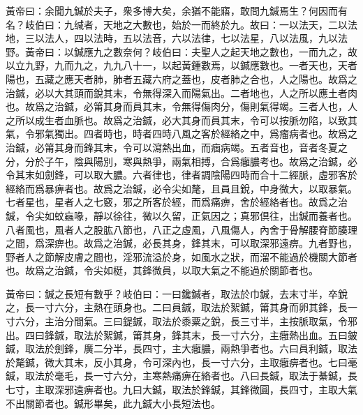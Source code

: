 \documentclass[12pt]{ctexbook}%
\begin{document}

\begin{yuanwen}
黃帝曰：余聞九鍼於夫子，衆多博大矣，余猶不能寤，敢問九鍼焉生？何因而有名？岐伯曰：九缄者，天地之大數也，始於一而終於九。故曰：一以法天，二以法地，三以法人，四以法時，五以法音，六以法律，七以法星，八以法風，九以法野。黃帝曰：以鍼應九之數奈何？岐伯曰：夫聖人之起天地之數也，一而九之，故以立九野，九而九之，九九八十一，以起黃鍾數焉，以鍼應數也。一者天也，天者陽也，五藏之應天者肺，肺者五藏六府之蓋也，皮者肺之合也，人之陽也。故爲之治鍼，必以大其頭而銳其末，令無得深入而陽氣出。二者地也，人之所以應土者肉也。故爲之治鍼，必𥮉其身而員其末，令無得傷肉分，傷則氣得竭。三者人也，人之所以成生者血脈也。故爲之治鍼，必大其身而員其末，令可以按脈勿陷，以致其氣，令邪氣獨出。四者時也，時者四時八風之客於經絡之中，爲瘤病者也。故爲之治鍼，必𥮉其身而鋒其末，令可以瀉熱出血，而痼病竭。五者音也，音者冬夏之分，分於子午，陰與陽別，寒與熱爭，兩氣相搏，合爲癰膿考也。故爲之治鍼，必令其末如劍鋒，可以取大膿。六者律也，律者調陰陽四時而合十二經脈，虛邪客於經絡而爲暴痹者也。故爲之治鍼，必令尖如氂，且員且銳，中身微大，以取暴氣。七者星也，星者人之七竅，邪之所客於經，而爲痛痹，舍於經絡者也。故爲之治鍼，令尖如蚊蝱喙，靜以徐往，微以久留，正氣因之；真邪倶往，出鍼而養者也。八者風也，風者人之股肱八節也，八正之虛風，八風傷人，內舍于骨解腰脊節腠理之間，爲深痹也。故爲之治鍼，必長其身，鋒其末，可以取深邪遠痹。九者野也，野者人之節解皮膚之間也，淫邪流溢於身，如風水之狀，而溜不能過於機關大節者也。故爲之治鍼，令尖如梃，其鋒微員，以取大氣之不能過於關節者也。

黃帝曰：鍼之長短有數乎？岐伯曰：一曰鑱鍼者，取法於巾鍼，去末寸半，卒銳之，長一寸六分，主熱在頭身也。二曰員鍼，取法於絮鍼，𥮉其身而卵其鋒，長一寸六分，主治分間氣。三曰鍉鍼，取法於黍粟之銳，長三寸半，主按脈取氣，令邪出。四曰鋒鍼，取法於絮鍼，𥮉其身，鋒其末，長一寸六分，主癰熱出血。五曰鈹鍼，取法於劍鋒，廣二分半，長四寸，主大癰膿，兩熱爭者也。六曰員利鍼，取法於氂鍼，微大其末，反小其身，令可深內也，長一寸六分，主取癰痹者也。七曰毫鍼，取法於毫毛，長一寸六分，主寒熱痛痹在絡者也。八曰長鍼，取法于綦鍼，長七寸，主取深邪遠痹者也。九曰大鍼，取法於鋒鍼，其鋒微圓，長四寸，主取大氣不出關節者也。鍼形畢矣，此九鍼大小長短法也。
\end{yuanwen}

\end{document}
